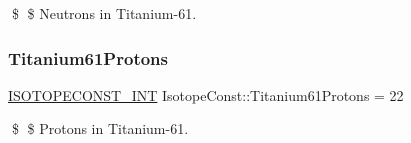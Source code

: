 \$ \$ Neutrons in Titanium-\/61. \mbox{\label{group___isotope_const-_titanium-_ti61_gad724f72420da5d5508da818b6cad2570}} 
\subsubsection{\texorpdfstring{Titanium61\+Protons}{Titanium61Protons}}
{\footnotesize\ttfamily \mbox{\hyperlink{group___isotope_const-_macros_ga5f18360b3e99483a35c32d789e62621c}{I\+S\+O\+T\+O\+P\+E\+C\+O\+N\+S\+T\+\_\+\+I\+NT}} Isotope\+Const\+::\+Titanium61\+Protons = 22}

\$ \$ Protons in Titanium-\/61. 